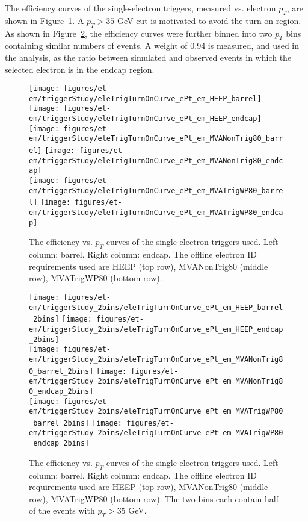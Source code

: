 The efficiency curves of the single-electron triggers, measured
vs. electron $p_{T}$, are shown in Figure~\ref{fig:eturnon}. A
$p_{T}>35$ GeV cut is motivated to avoid the turn-on region. As shown
in Figure~\ref{fig:eturnon2}, the efficiency curves were further
binned into two $p_T$ bins containing similar numbers of events.  A
weight of 0.94 is measured, and used in the analysis, as the ratio
between simulated and observed events in which the selected electron
is in the endcap region.
\begin{figure}\centering
  \texttt{[image: figures/et-em/triggerStudy/eleTrigTurnOnCurve\_ePt\_em\_HEEP\_barrel]}
  \texttt{[image: figures/et-em/triggerStudy/eleTrigTurnOnCurve\_ePt\_em\_HEEP\_endcap]} \\
  \texttt{[image: figures/et-em/triggerStudy/eleTrigTurnOnCurve\_ePt\_em\_MVANonTrig80\_barrel]}
  \texttt{[image: figures/et-em/triggerStudy/eleTrigTurnOnCurve\_ePt\_em\_MVANonTrig80\_endcap]} \\
  \texttt{[image: figures/et-em/triggerStudy/eleTrigTurnOnCurve\_ePt\_em\_MVATrigWP80\_barrel]}
  \texttt{[image: figures/et-em/triggerStudy/eleTrigTurnOnCurve\_ePt\_em\_MVATrigWP80\_endcap]}
  \caption{\label{fig:eturnon} The efficiency vs. $p_{T}$ curves of the
    single-electron triggers used.  Left column: barrel.  Right
    column: endcap.  The offline electron ID requirements used are
    HEEP (top row), MVANonTrig80 (middle row), MVATrigWP80 (bottom
    row).}
\end{figure}
\begin{figure}\centering
  \texttt{[image: figures/et-em/triggerStudy\_2bins/eleTrigTurnOnCurve\_ePt\_em\_HEEP\_barrel\_2bins]}
  \texttt{[image: figures/et-em/triggerStudy\_2bins/eleTrigTurnOnCurve\_ePt\_em\_HEEP\_endcap\_2bins]} \\
  \texttt{[image: figures/et-em/triggerStudy\_2bins/eleTrigTurnOnCurve\_ePt\_em\_MVANonTrig80\_barrel\_2bins]}
  \texttt{[image: figures/et-em/triggerStudy\_2bins/eleTrigTurnOnCurve\_ePt\_em\_MVANonTrig80\_endcap\_2bins]} \\
  \texttt{[image: figures/et-em/triggerStudy\_2bins/eleTrigTurnOnCurve\_ePt\_em\_MVATrigWP80\_barrel\_2bins]}
  \texttt{[image: figures/et-em/triggerStudy\_2bins/eleTrigTurnOnCurve\_ePt\_em\_MVATrigWP80\_endcap\_2bins]}
  \caption{\label{fig:eturnon2} The efficiency vs. $p_{T}$ curves of the
    single-electron triggers used.  Left column: barrel.  Right
    column: endcap.  The offline electron ID requirements used are
    HEEP (top row), MVANonTrig80 (middle row), MVATrigWP80 (bottom
    row).  The two bins each contain half of the events with
    $p_{T}>35$ GeV.}
\end{figure}

